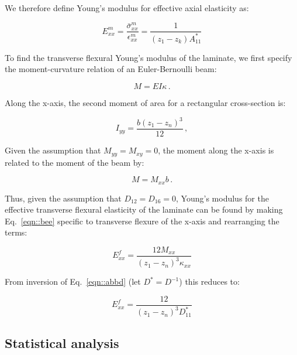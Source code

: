 \documentclass[twocolumn, linenumbers, superscriptaddress, nofootinbib]{revtex4-1}
\begin{document}
				We therefore define Young's modulus for effective axial elasticity as:
				
				\begin{equation}
					E^m_{xx} = \frac{\bar{\sigma}^m_{xx}}{\epsilon^m_{xx}} = \frac{1}{(z_1 - z_k)A^*_{11}}
				\end{equation}
				
				To find the transverse flexural Young's modulus of the laminate, we first specify the moment-curvature relation of an Euler-Bernoulli beam:
				
				\begin{equation}
				\label{eqn::bee}
				M = EI\kappa\,.
				\end{equation}
				
				Along the x-axis, the second moment of area for a rectangular cross-section is:
				
				\begin{equation}
					I_{yy} = \frac{b(z_1 - z_n)^3}{12}\,,
				\end{equation}	
				
				Given the assumption that $M_{yy} = M_{xy} = 0$, the moment along the x-axis is related to the moment of the beam by:
				
				\begin{equation}
					M = M_{xx}b\,.
				\end{equation}
				
				Thus, given the assumption that $D_{12} = D_{16} = 0$, Young's modulus for the effective transverse flexural elasticity of the laminate can be found by making Eq.~\ref{eqn::bee} specific to transverse flexure of the x-axis and rearranging the terms:
				
				\begin{equation}
					E^f_{xx} = \frac{12M_{xx}}{(z_1 - z_n)^3\kappa_{xx}}
				\end{equation}
				
				From inversion of Eq.~\ref{eqn::abbd} (let $D^* = D^{-1}$) this reduces to:
				
				\begin{equation}
					E^f_{xx} = \frac{12}{(z_1 - z_n)^3D^*_{11}}
				\end{equation}
					
		\subsection*{Statistical analysis}
\end{document}
